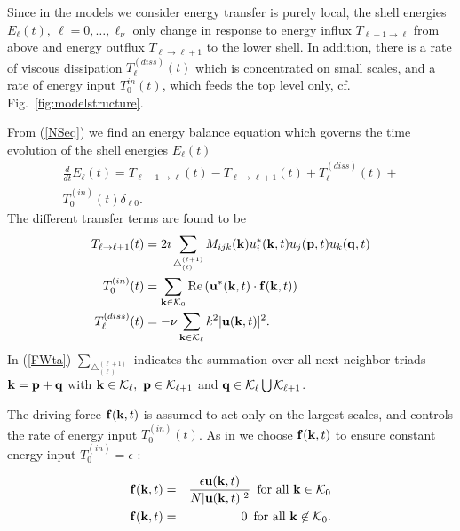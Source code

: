 \documentclass[dc]{svjour}
\begin{document}
Since in the models we consider energy transfer is purely local,
the shell energies $E_{\ell}(t),\ \ell=0,\dots,\ell_{\nu}$ only change
in response to energy influx $T_{\ell-1\rightarrow \ell}$ from above
and energy outflux $T_{\ell\rightarrow \ell+1}$ to the lower
shell. In addition, there is a rate of viscous dissipation
$T_{\ell}^{(diss)}(t)$ which is concentrated on small scales,
and a rate of energy input $T_{0}^{in}(t)$, which feeds
the top level only, cf. Fig.~\ref{fig:modelstructure}.

From (\ref{NSeq}) we find an energy balance equation which governs
the time evolution of the shell energies $E_{\ell}(t)$
\begin{multline}
  \label{energyconservationlaw}
  \frac{d}{dt} E_{\ell}(t)=T_{\ell-1\rightarrow \ell}(t)-T_{\ell\rightarrow
    \ell+1}(t)+T_{\ell}^{(diss)}(t)+\\ T_{0}^{(in)}(t)\delta_{\ell0} .
\end{multline}
The different transfer terms are found to be
\begin{align}
\label{FWtransfer}
  T_{\ell\rightarrow \ell+1}(t) &=
       2\imath \sum_{\triangle^{(\ell+1)}_{(\ell)}}
  M_{ijk}({\bf k}) u_{i}^{*}({\bf k},t)u_{j}({\bf p},t)u_{k}({\bf q},t)
  \label{FWta}\\
  T_{0}^{(in)}(t) &= \sum_{{\bf k}\in{\cal K}_{0}} \mbox{\rm Re}\left({\bf
    u}^{*}({\bf k},t)\cdot{\bf f}({\bf k},t)\right) \label{FWtb}\\
  T_{\ell}^{(diss)}(t) &= -\nu \sum_{{\bf k}\in{\cal K}_{\ell}} k^{2}|{\bf
    u}({\bf k},t)|^{2} \label{FWtc}.
\end{align}
%
In (\ref{FWta}) $\sum_{\triangle^{(\ell+1)}_{(\ell)}}$
indicates the summation over all
next-neighbor triads ${\bf k}={\bf p}+{\bf q}$ with ${\bf k}\in {\cal
  K}_{\ell},\ {\bf p}\in{\cal K}_{\ell+1}$ and ${\bf q}\in{\cal
  K}_{\ell}\bigcup{\cal K}_{\ell+1}$.

The driving force ${\bf f}({\bf k},t)$ is assumed to act only on the
largest scales, and controls the rate of energy input
$T_{0}^{(in)}(t)$. As in \cite{eggers91a}
we choose ${\bf f}({\bf k},t)$ to ensure constant energy input
$T^{(in)}_0 = \epsilon$ :

    \begin{eqnarray}
    \label{force}
      {\bf f}({\bf k},t)&=&\frac{\epsilon {\bf u}({\bf k},t)}{N|{\bf
          u}({\bf k},t)|^{2}} \enspace \mbox{for all } {\bf k}\in{\cal
        K}_0\\ {\bf f}({\bf k},t)&=&0 \enspace \mbox{for all } {\bf
        k}\not\in{\cal K}_0 .
    \end{eqnarray}
%
\end{document}
